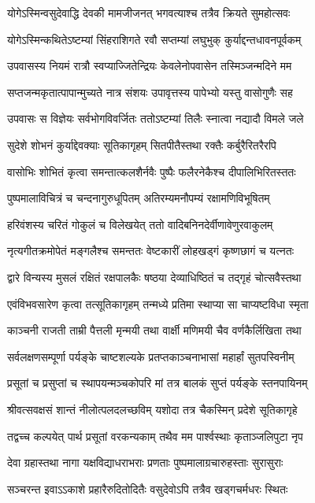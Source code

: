 \twolineshloka
{योगेऽस्मिन्वसुदेवाद्धि देवकी मामजीजनत्}
{भगवत्याश्च तत्रैव क्रियते सुमहोत्सवः}%

\twolineshloka
{योगेऽस्मिन्कथितेऽष्टम्यां सिंहराशिगते रवौ}
{सप्तम्यां लघुभुक् कुर्याद्दन्तधावनपूर्वकम्}%

\twolineshloka
{उपवासस्य नियमं रात्रौ स्वप्याज्जितेन्द्रियः}
{केवलेनोपवासेन तस्मिञ्जन्मदिने मम}%

\twolineshloka
{सप्तजन्मकृतात्पापान्मुच्यते नात्र संशयः}
{उपावृत्तस्य पापेभ्यो यस्तु वासोगुणैः सह}%

\twolineshloka
{उपवासः स विज्ञेयः सर्वभोगविवर्जितः}
{ततोऽष्टम्यां तिलैः स्नात्वा नद्यादौ विमले जले}%

\twolineshloka
{सुदेशे शोभनं कुर्याद्देवक्याः सूतिकागृहम्}
{सितपीतैस्तथा रक्तैः कर्बुरैरितरैरपि}%

\twolineshloka
{वासोभिः शोभितं कृत्वा समन्तात्कलशैर्नवैः}
{पुष्पैः फलैरनेकैश्च दीपालिभिरितस्ततः}%

\twolineshloka
{पुष्पमालाविचित्रं च चन्दनागुरुधूपितम्}
{अतिरम्यमनौपम्यं रक्षामणिविभूषितम्}%

\twolineshloka
{हरिवंशस्य चरितं गोकुलं च विलेखयेत्}
{ततो वादिबनिनदेर्वीणावेणुरवाकुलम्}%

\twolineshloka
{नृत्यगीतक्रमोपेतं मङ्गलैश्च समन्ततः}
{वेष्टकारीं लोहखड्गं कृष्णछागं च यत्नतः}%

\twolineshloka
{द्वारे विन्यस्य मुसलं रक्षितं रक्षपालकैः}
{षष्ठया देव्याधिष्ठितं च तद्गृहं चोत्सवैस्तथा}%

\twolineshloka
{एवंविभवसारेण कृत्वा तत्सूतिकागृहम्}
{तन्मध्ये प्रतिमा स्थाप्या सा चाप्यष्टविधा स्मृता}%

\twolineshloka
{काञ्चनी राजती ताम्री पैत्तली मृन्मयी तथा}
{वार्क्षी मणिमयी चैव वर्णकैर्लिखिता तथा}%

\twolineshloka
{सर्वलक्षणसम्पूर्णा पर्यङ्के चाष्टशल्यके}
{प्रतप्तकाञ्चनाभासां महार्हां सुतपस्विनीम्}%

\twolineshloka
{प्रसूतां च प्रसुप्तां च स्थापयन्मञ्चकोपरि}
{मां तत्र बालकं सुप्तं पर्यङ्के स्तनपायिनम्}%

\twolineshloka
{श्रीवत्सवक्षसं शान्तं नीलोत्पलदलच्छविम्}
{यशोदा तत्र चैकस्मिन् प्रदेशे सूतिकागृहे}%

\twolineshloka
{तद्वच्च कल्पयेत् पार्थ प्रसूतां वरकन्यकाम्}
{तथैव मम पार्श्वस्थाः कृताञ्जलिपुटा नृप}%

\twolineshloka
{देवा ग्रहास्तथा नागा यक्षविद्याधराभराः}
{प्रणताः पुष्पमालाग्रचारुहस्ताः सुरासुराः}%

\twolineshloka
{सञ्चरन्त इवाऽऽकाशे प्रहारैरुदितोदितैः}
{वसुदेवोऽपि तत्रैव खड्गचर्मधरः स्थितः}%


